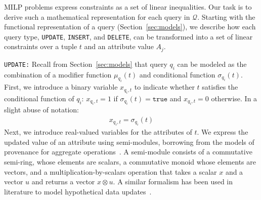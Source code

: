 MILP problems express constraints as a set of linear inequalities. Our
task is to derive such a mathematical representation for each query in
$\mathcal{Q}$. Starting with the functional representation of a
query (Section~\ref{sec:models}), we describe how each query type,
\texttt{UPDATE}, \texttt{INSERT}, and \texttt{DELETE}, can be
transformed into a set of linear constraints over a tuple $t$ and an
attribute value $A_j$.



\smallskip
\noindent
\texttt{UPDATE:}
Recall from Section~\ref{sec:models} that query $q_i$ can be modeled
as the combination of a modifier function $\mu_{q_i}(t)$ and
conditional function $\sigma_{q_i}(t)$. First, we introduce a binary
variable $x_{q_i, t}$ to indicate whether $t$ satisfies the
conditional function of $q_i$: $x_{q_i, t}=1$ if
$\sigma_{q_i}(t)=\texttt{true}$ and $x_{q_i, t}=0$ otherwise. In a
slight abuse of notation:
\begin{align}
\label{eq:x}
x_{q_i, t} = \sigma_{q_i}(t)
\end{align}
Next, we introduce real-valued variables for the attributes of $t$.
We express the updated value
of an attribute using semi-modules, borrowing from the models of
provenance for aggregate operations~\cite{Amsterdamer2011}. A
semi-module consists of a commutative semi-ring, whose elements are
scalars, a commutative monoid whose elements are vectors, and a
multiplication-by-scalars operation that takes a scalar $x$ and a
vector $u$ and returns a vector $x \otimes u$. A similar formalism has
been used in literature to model hypothetical data
updates~\cite{tiresias}.

